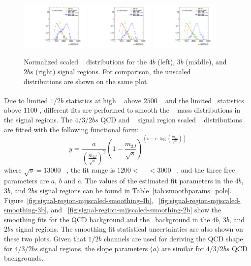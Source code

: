 \begin{figure}[htb!]
\begin{center}
\includegraphics[width=0.3\textwidth,angle=-90]{figures/boosted/Other/FourTag_Signal_compare_scale_mHH_1.pdf}
\includegraphics[width=0.3\textwidth,angle=-90]{figures/boosted/Other/ThreeTag_Signal_compare_scale_mHH_1.pdf}
\includegraphics[width=0.3\textwidth,angle=-90]{figures/boosted/Other/TwoTag_split_Signal_compare_scale_mHH_1.pdf}
\caption{Normalized scaled \mtwoJ~ distributions for the $4b$ (left), $3b$ (middle), and $2bs$ (right) signal regions. For comparison, the unscaled  \mtwoJ~ distributions are shown on the same plot. }
\label{fig:signal-region-bkg-scaled}
\end{center}
\end{figure}

\paragraph{} 
Due to limited $1/2b$ statistics at high \mtwoJ~ above $2500$ \GeV~ and the limited \ttbar~statistics above $1100$ \GeV, different fits are performed to smooth the \mtwoJ~ mass distributions in the signal regions. 
The $4/3/2bs$ QCD and \ttbar~ signal region scaled \mtwoJ~ distributions are fitted with the following functional form:
\begin{equation}
\label{eq:boosted_dijet}
y = \frac{a}{(\frac{m_{2J}}{\sqrt{s}})^2} (1-\frac{m_{2J}}{\sqrt{s}})^{(b - c\ \log(\frac{m_{2J}}{\sqrt{s}}))}
\end{equation}
where $\sqrt{s} = 13000$ \GeV~, the fit range is $1200 <$ \mtwoJ~ $< 3000$ \GeV~, and the three free parameters are $a$, $b$ and $c$.
The values of the estimated fit parameters in the $4b$, $3b$, and $2bs$ signal regions can be found in Table~\ref{tab:smoothparams_pole}.
Figure~\ref{fig:signal-region-mjjscaled-smoothing-4b}, ~\ref{fig:signal-region-mjjscaled-smoothing-3b}, and ~\ref{fig:signal-region-mjjscaled-smoothing-2b} show the smoothing fits for the QCD background and the \ttbar\ background in the $4b$, $3b$, and $2bs$ signal regions.
The smoothing fit statistical uncertainties are also shown on these two plots. 
Given that $1/2b$ channels are used for deriving the QCD shape for $4/3/2bs$ signal regions, the slope parameters ($a$) are similar for $4/3/2bs$ QCD backgrounds.


